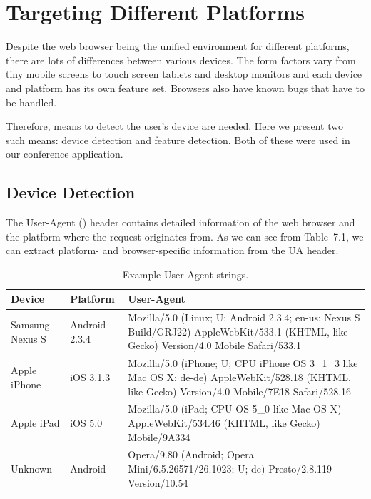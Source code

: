\section{Targeting Different Platforms}
\label{section:targeting-platforms}

Despite the web browser being the unified environment for different
platforms, there are lots of differences between various devices. The
form factors vary from tiny mobile screens to touch screen tablets and
desktop monitors and each device and platform has its own feature
set. Browsers also have known bugs that have to be handled.

Therefore, means to detect the user's device are needed. Here we
present two such means: device detection and feature detection. Both
of these were used in our conference application.

\subsection{Device Detection}
\label{subsection:device-detection}

The User-Agent ()  header contains detailed
information of the web browser and the platform where the request
originates from. As we can see from Table~7.1\tableref, we can extract
platform- and browser-specific information from the UA header.

\begin{table}
  \begin{tabular}{ l | l | p{7cm} }
    \textbf{Device} & \textbf{Platform} & \textbf{User-Agent} \\ \hline
    Samsung Nexus S & Android 2.3.4 & Mozilla/5.0 (Linux; U; Android 2.3.4; en-us; Nexus S Build/GRJ22) AppleWebKit/533.1 (KHTML, like Gecko) Version/4.0 Mobile Safari/533.1 \\ \hline
    Apple iPhone & iOS 3.1.3 & Mozilla/5.0 (iPhone; U; CPU iPhone OS 3\_1\_3 like Mac OS X; de-de) AppleWebKit/528.18 (KHTML, like Gecko) Version/4.0 Mobile/7E18 Safari/528.16 \\ \hline
    Apple iPad & iOS 5.0 & Mozilla/5.0 (iPad; CPU OS 5\_0 like Mac OS X) AppleWebKit/534.46 (KHTML, like Gecko) Mobile/9A334 \\ \hline
    Unknown & Android & Opera/9.80 (Android; Opera Mini/6.5.26571/26.1023; U; de) Presto/2.8.119 Version/10.54 \\ \hline
  \end{tabular}
  \label{table:user-agents}
  \caption{Example User-Agent strings.}
\end{table}

